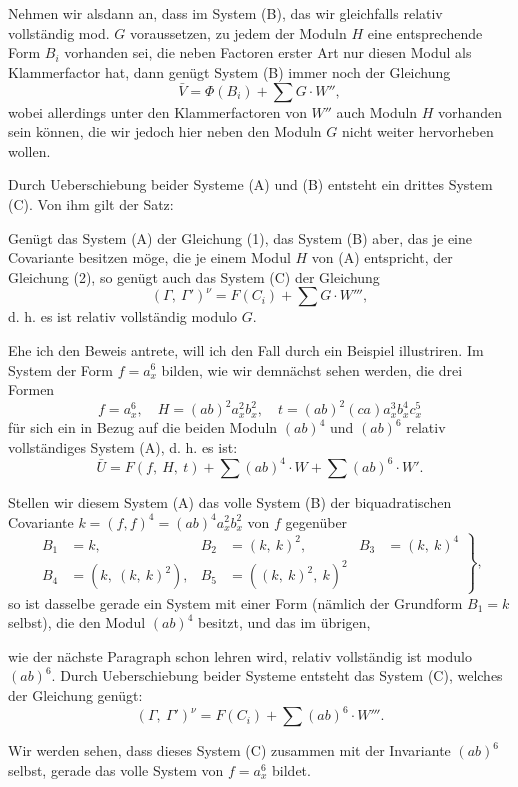 \documentclass[11pt]{article}
\providecommand{\weberpage}[1]{}
\providecommand{\weq}[2]{\begin{equation}\tag{#1}#2\end{equation}}
\let\Gamma\varGamma
\let\Phi\varPhi
\begin{document}
Nehmen wir alsdann an, dass im System (B), das wir gleichfalls relativ
vollständig mod. $G$ voraussetzen, zu jedem der Moduln $H$ eine
entsprechende Form $B_i$ vorhanden sei, die neben Factoren erster Art nur
diesen Modul als Klammerfactor hat, dann genügt System (B) immer noch der
Gleichung
\weq{2}{\bar V = \Phi(B_i) + \sum G\cdot W'',}
wobei allerdings unter den Klammerfactoren von $W''$ auch Moduln $H$
vorhanden sein können, die wir jedoch hier neben den Moduln $G$ nicht
weiter hervorheben wollen.

Durch Ueberschiebung beider Systeme (A) und (B) entsteht ein drittes
System (C). Von ihm gilt der Satz:

\glqq Genügt das System (A) der Gleichung (1), das System (B) aber, das
je eine Covariante besitzen möge, die je einem Modul $H$ von (A)
entspricht, der Gleichung (2), so genügt auch das System (C) der
Gleichung
\[ (\Gamma,\ \Gamma')^\nu = F(C_i) + \sum G\cdot W''', \]
d. h. es ist relativ vollständig modulo $G$.\grqq{}

Ehe ich den Beweis antrete, will ich den Fall durch ein Beispiel
illustriren. Im System der Form $f=a_x^6$ bilden, wie wir demnächst sehen
werden, die drei Formen
\[ f = a_x^6,\quad H = (ab)^2 a_x^2 b_x^2,\quad t = (ab)^2(ca) a_x^3 b_x^4 c_x^5 \]
für sich ein in Bezug auf die beiden Moduln $(ab)^4$ und $(ab)^6$ relativ
vollständiges System (A), d. h. es ist:
\[ \bar U = F(f,\ H,\ t) + \sum (ab)^4\cdot W + \sum (ab)^6\cdot W'. \]

Stellen wir diesem System (A) das volle System (B) der biquadratischen
Covariante $k=(f,f)^4=(ab)^4a_x^2b_x^2$ von $f$ gegenüber
\weq{B}{\left.\begin{aligned}
B_1&=k, & B_2&=(k,\ k)^2, & B_3&=(k,\ k)^4\\
B_4&=(k,\ (k,\ k)^2), & B_5&=((k,\ k)^2,\ k)^2
\end{aligned}\right\},}
so ist dasselbe gerade ein System mit einer Form (nämlich der Grundform
$B_1=k$ selbst), die den Modul $(ab)^4$ besitzt, und das im übrigen,


\weberpage{230}
wie der nächste Paragraph schon lehren wird, relativ vollständig ist
modulo $(ab)^6$. Durch Ueberschiebung beider Systeme entsteht das System
(C), welches der Gleichung genügt:
\[ (\Gamma,\ \Gamma')^\nu = F(C_i) + \sum (ab)^6\cdot W'''. \]

Wir werden sehen, dass dieses System (C) zusammen mit der Invariante
$(ab)^6$ selbst, gerade das volle System von $f=a_x^6$ bildet.
\end{document}
